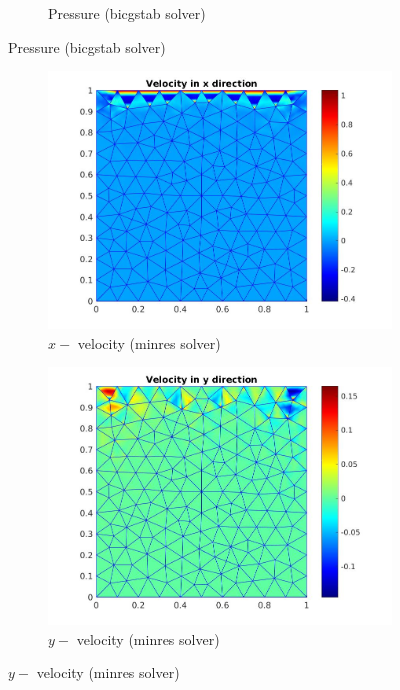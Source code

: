 \documentclass[a4paper]{book}
\begin{document}
\begin{figure}[H]
\begin{subfigure}{\textwidth}
  \caption{Pressure (bicgstab solver)}
  \label{pressure_stoke_bicgstab_lid}
\end{subfigure}
\end{figure}
\begin{figure}[H]
\begin{subfigure}{0.5\textwidth}	
  \includegraphics[width=\linewidth]{lid_minres_vx.jpg}
  \caption{$x-$ velocity (minres solver)}
  \label{x_vel_stoke_minres_lid}
\end{subfigure}
\begin{subfigure}{0.5\textwidth}	
  \includegraphics[width=\linewidth]{lid_minres_vy.jpg}
  \caption{$y-$ velocity (minres solver)}
  \label{y_vel_stoke_minres_lid}
\end{subfigure}

\end{figure}
\end{document}
